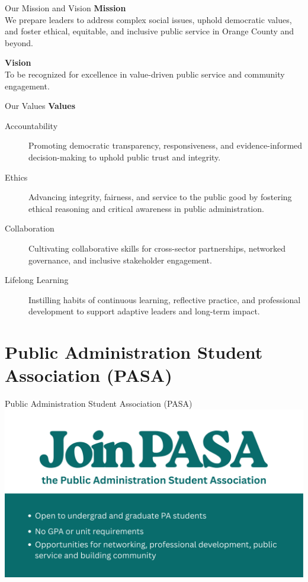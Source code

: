 \documentclass[10pt]{beamer}
\begin{document}
\begin{frame}{Our Mission and Vision}
\textbf{Mission}\\
We prepare leaders to address complex social issues, uphold democratic values, and foster ethical, equitable, and inclusive public service in Orange County and beyond.

\vspace{0.8em}
\textbf{Vision}\\
To be recognized for excellence in value-driven public service and community engagement.
\end{frame}

\begin{frame}{Our Values}
\textbf{Values}
\begin{description}
  \item[Accountability] Promoting democratic transparency, responsiveness, and evidence-informed decision-making to uphold public trust and integrity.
  \item[Ethics] Advancing integrity, fairness, and service to the public good by fostering ethical reasoning and critical awareness in public administration.
  \item[Collaboration] Cultivating collaborative skills for cross-sector partnerships, networked governance, and inclusive stakeholder engagement.
  \item[Lifelong Learning] Instilling habits of continuous learning, reflective practice, and professional development to support adaptive leaders and long-term impact.
\end{description}
\end{frame}

\section{\textcolor{titanorange}{Public Administration Student Association (PASA)}}

\begin{frame}{Public Administration Student Association (PASA)}
  \centering
  \includegraphics[width=\textwidth]{images/join_PASA.png}
\end{frame}
\end{document}
